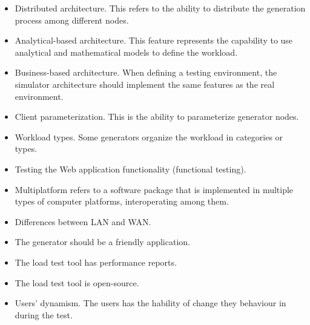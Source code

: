 \documentclass{report}
\begin{document}
\begin{itemize}
\item Distributed architecture. This refers to the ability to distribute the generation process among different nodes.
\item Analytical-based architecture. This feature represents the capability to use analytical and mathematical models to define the workload.
\item Business-based architecture. When defining a testing environment, the simulator architecture should implement the same features as the real environment.
\item Client parameterization. This is the ability to parameterize generator nodes.
\item Workload types. Some generators organize the workload in categories or types.
\item Testing the Web application functionality (functional testing).
\item Multiplatform refers to a software package that is implemented in multiple types of computer platforms, interoperating among them.
\item Differences between LAN and WAN.
\item The generator should be a friendly application.
\item The load test tool has performance reports.
\item The load test tool is open-source.
\item Users’ dynamism. The users has the hability of change they behaviour in during the test.
\end{itemize}
\end{document}
